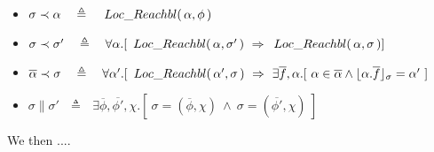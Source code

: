 { 
 
\begin{definition}
$~ $ %
\label{def:prec}
\begin{itemize}
\item
$\sigma \prec \alpha\ \ \ \triangleq\ \ \ \LRelevant {\alpha} {\phi}$
\item
$\sigma \prec \sigma'\ \ \ \triangleq\ \ \  \forall \alpha.[\ \LRelevant {\alpha} {\sigma'} \ \Rightarrow \  \LRelevant {\alpha} {\sigma}] $
\item
$\overline \alpha \prec \sigma \ \ \ \triangleq\ \ \  \forall \alpha'.[\ \LRelevant {\alpha'} {\sigma} \ \Rightarrow \  \exists \overline f, \alpha. [\ \alpha \in \overline \alpha \wedge 
\interpret \sigma {\alpha.{\overline f}} = \alpha' \ ]$
\item
$\sigma \parallel \sigma'  \ \ \ \triangleq\ \ \ \exists \overline \phi,  \overline {\phi'}, \chi. [\ \sigma=( \overline \phi, \chi )\ \wedge\ 
\sigma=( \overline {\phi'}, \chi )\ ]$
\end{itemize}
\end{definition}

We then ....

}
